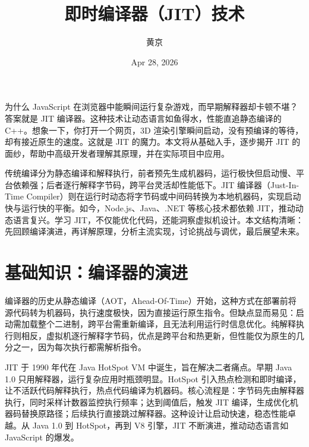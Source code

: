 \title{即时编译器（JIT）技术}
\author{黄京}
\date{Apr 28, 2026}
\maketitle
为什么 JavaScript 在浏览器中能瞬间运行复杂游戏，而早期解释器却卡顿不堪？答案就是 JIT 编译器。这种技术让动态语言如鱼得水，性能直追静态编译的 C++。想象一下，你打开一个网页，3D 渲染引擎瞬间启动，没有预编译的等待，却有接近原生的速度。这就是 JIT 的魔力。本文将从基础入手，逐步揭开 JIT 的面纱，帮助中高级开发者理解其原理，并在实际项目中应用。\par
传统编译分为静态编译和解释执行，前者预先生成机器码，运行极快但启动慢、平台依赖强；后者逐行解释字节码，跨平台灵活却性能低下。JIT 编译器（Just-In-Time Compiler）则在运行时动态将字节码或中间码转换为本地机器码，实现启动快与运行快的平衡。如今，Node.js、Java、.NET 等核心技术都依赖 JIT，推动动态语言复兴。学习 JIT，不仅能优化代码，还能洞察虚拟机设计。本文结构清晰：先回顾编译演进，再详解原理，分析主流实现，讨论挑战与调优，最后展望未来。\par
\chapter{基础知识：编译器的演进}
编译器的历史从静态编译（AOT，Ahead-Of-Time）开始，这种方式在部署前将源代码转为机器码，执行速度极快，因为直接运行原生指令。但缺点显而易见：启动需加载整个二进制，跨平台需重新编译，且无法利用运行时信息优化。纯解释执行则相反，虚拟机逐行解释字节码，优点是跨平台和热更新，但性能仅为原生的几分之一，因为每次执行都需解析指令。\par
JIT 于 1990 年代在 Java HotSpot VM 中诞生，旨在解决二者痛点。早期 Java 1.0 只用解释器，运行复杂应用时瓶颈明显。HotSpot 引入热点检测和即时编译，让不活跃代码解释执行，热点代码编译为机器码。核心流程是：字节码先由解释器执行，同时采样计数器监控执行频率；达到阈值后，触发 JIT 编译，生成优化机器码替换原路径；后续执行直接跳过解释器。这种设计让启动快速，稳态性能卓越。从 Java 1.0 到 HotSpot，再到 V8 引擎，JIT 不断演进，推动动态语言如 JavaScript 的爆发。\par
